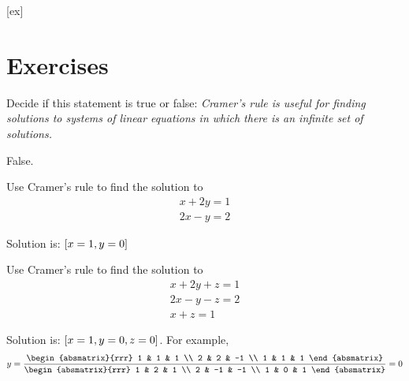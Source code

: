 [ex]
\section*{Exercises}

\begin{enumialphparenastyle}

\begin{ex}Decide if this statement is true or false: \textit{Cramer's rule is useful for finding solutions to systems of linear
equations in which there is an infinite set of solutions.} 
\begin{sol}
False.
\end{sol}
\end{ex}

\begin{ex} Use Cramer's rule to find the solution to 
\begin{equation*}
\begin{array}{c}
x+2y=1 \\
2x-y=2
\end{array}
\end{equation*}
\begin{sol}
Solution is: $\left[x=1,y=0\right] $
\end{sol}
\end{ex}

\begin{ex} Use Cramer's rule to find the solution to 
\begin{equation*}
\begin{array}{c}
x+2y+z=1 \\
2x-y-z=2 \\
x+z=1
\end{array}
\end{equation*}
\begin{sol}
Solution is: $\left[x=1,y=0,z=0\right]$. For example,
\begin{equation*}
y=\frac{\begin{absmatrix}{rrr}
1 & 1 & 1 \\
2 & 2 & -1 \\
1 & 1 & 1
\end{absmatrix}}{\begin{absmatrix}{rrr}
1 & 2 & 1 \\
2 & -1 & -1 \\
1 & 0 & 1
\end{absmatrix}}=0
\end{equation*}
\end{sol}
\end{ex}

\end{enumialphparenastyle}
